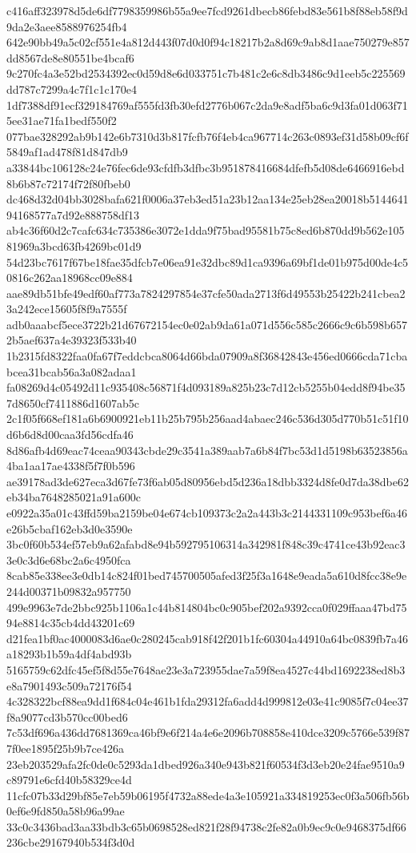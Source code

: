 {c416aff323978d5de6df7798359986b55a9ee7fcd9261dbecb86febd83e561b8f88eb58f9d9da2e3aee8588976254fb4
642e90bb49a5c02cf551e4a812d443f07d0d0f94c18217b2a8d69c9ab8d1aae750279e857dd8567de8e80551be4bcaf6
9c270fc4a3e52bd2534392ec0d59d8e6d033751c7b481c2e6c8db3486c9d1eeb5c225569dd787c7299a4c7f1c1c170e4
1df7388df91ecf329184769af555fd3fb30efd2776b067c2da9e8adf5ba6c9d3fa01d063f715ee31ae71fa1bedf550f2
077bae328292ab9b142e6b7310d3b817fcfb76f4eb4ca967714c263c0893ef31d58b09cf6f5849af1ad478f81d847db9
a33844bc106128c24e76fec6de93cfdfb3dfbc3b951878416684dfefb5d08de6466916ebd8b6b87c72174f72f80fbeb0
dc468d32d04bb3028bafa621f0006a37eb3ed51a23b12aa134e25eb28ea20018b514464194168577a7d92e888758df13
ab4c36f60d2c7cafc634c735386e3072e1dda9f75bad95581b75c8ed6b870dd9b562e10581969a3bcd63fb4269bc01d9
54d23bc7617f67be18fae35dfcb7e06ea91e32dbc89d1ca9396a69bf1de01b975d00de4c50816c262aa18968cc09e884
aae89db51bfe49edf60af773a7824297854e37cfe50ada2713f6d49553b25422b241cbea23a242ece15605f8f9a7555f
adb0aaabcf5ece3722b21d67672154ec0e02ab9da61a071d556c585c2666c9c6b598b6572b5aef637a4e39323f533b40
1b2315fd8322faa0fa67f7eddcbca8064d66bda07909a8f36842843e456ed0666cda71cbabcea31bcab56a3a082adaa1
fa08269d4c05492d11c935408c56871f4d093189a825b23c7d12cb5255b04edd8f94be357d8650cf7411886d1607ab5c
2c1f05f668ef181a6b6900921eb11b25b795b256aad4abaec246c536d305d770b51c51f10d6b6d8d00caa3fd56cdfa46
8d86afb4d69eac74ceaa90343cbde29c3541a389aab7a6b84f7bc53d1d5198b63523856a4ba1aa17ae4338f5f7f0b596
ae39178ad3de627eca3d67fe73f6ab05d80956ebd5d236a18dbb3324d8fe0d7da38dbe62eb34ba7648285021a91a600c
e0922a35a01c43ffd59ba2159be04e674cb109373c2a2a443b3c2144331109c953bef6a46e26b5cbaf162eb3d0e3590e
3bc0f60b534ef57eb9a62afabd8e94b592795106314a342981f848c39c4741ce43b92eac33e0c3d6e68bc2a6c4950fca
8cab85e338ee3e0db14c824f01bed745700505afed3f25f3a1648e9eada5a610d8fcc38e9e244d00371b09832a957750
499e9963e7de2bbc925b1106a1c44b814804bc0c905bef202a9392cca0f029ffaaa47bd7594e8814c35cb4dd43201c69
d21fea1bf0ac4000083d6ae0c280245cab918f42f201b1fc60304a44910a64bc0839fb7a46a18293b1b59a4df4abd93b
5165759c62dfc45ef5f8d55e7648ae23e3a723955dae7a59f8ea4527c44bd1692238ed8b3e8a7901493c509a72176f54
4c328322bcf88ea9dd1f684c04e461b1fda29312fa6add4d999812e03e41c9085f7c04ee37f8a9077cd3b570cc00bed6
7c53df696a436dd7681369ca46bf9e6f214a4e6e2096b708858e410dce3209c5766e539f877f0ee1895f25b9b7ce426a
23eb203529afa2fc0de0c5293da1dbed926a340e943b821f60534f3d3eb20e24fae9510a9c89791e6cfd40b58329ce4d
11cfc07b33d29bf85e7eb59b06195f4732a88ede4a3e105921a334819253ec0f3a506fb56b0ef6e9fd850a58b96a99ae
33c0c3436bad3aa33bdb3c65b0698528ed821f28f94738c2fe82a0b9ec9c0e9468375df66236cbe29167940b534f3d0d
}
